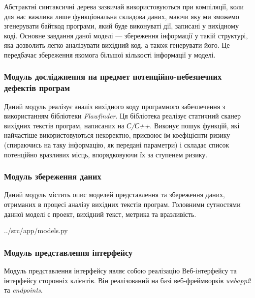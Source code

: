 Абстрактні синтаксичні дерева зазвичай використовуються при компіляції,
коли для нас важлива лише функціональна складова даних, маючи яку ми зможемо згенерувати байткод програми, який буде виконуваті дії, записані у вихідному
коді. Основне завдання даної моделі — збереження інформації у такій структурі,
яка дозволить легко  аналізувати вихідний код, а також генерувати його. Це  передбачає збереження якомога більшої кількості  інформації у моделі.

\subsubsection{Модуль досліджнення на предмет потенційно-небезпечних дефектів програм}
\label{module_vulnurabilities_search}
Даний модуль реалізує аналіз вихідного коду програмного забезпечення з використанням бібліотеки {\itshape Flawfinder}.
Ця бібліотека реалізує статичний сканер вихідних текстів програм, написаних на {\itshape С/С++}. Виконує пошук функцій, які найчастіше використовуються некоректно, присвоює їм коефіцієнти ризику (спираючись на таку інформацію, як передані параметри) і складає список потенційно вразливих місць, впорядковуючи їх за ступенем ризику.

\subsubsection{Модуль збереження даних}
\label{module_data_storing}
Даний модуль містить опис моделей представлення та збереження даних, отриманих в процесі аналізу вихідних текстів програм.
Головними сутностями данної моделі є проект, вихідний текст, метрика та вразливість.


{../src/app/models.py}

\subsubsection{Модуль представлення інтерфейсу}
\label{module_interface}
Модуль представлення інтерфейсу являє собою реалізацію Веб-інтерфейсу та інтерфейсу сторонніх клієнтів. Він реалізований на базі веб-фреймворків {\itshape webapp2} та {\itshape endpoints}.

